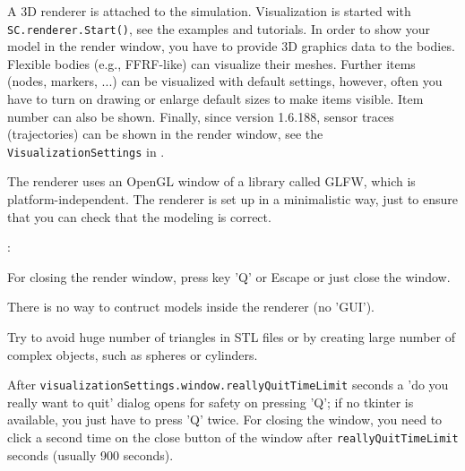 A 3D renderer is attached to the simulation. Visualization is started with  \texttt{SC.renderer.Start()}, see the examples and tutorials.
In order to show your model in the render window, you have to provide 3D graphics data to the bodies. Flexible bodies (e.g., FFRF-like) can visualize their meshes. Further items (nodes, markers, ...) can be visualized with default settings, however, often you have to turn on drawing or enlarge default sizes to make items visible. Item number can also be shown.
Finally, since version 1.6.188, sensor traces (trajectories) can be shown in the render window, see the \texttt{VisualizationSettings} in  .

The renderer uses an OpenGL window of a library called GLFW, which is platform-independent. 
The renderer is set up in a minimalistic way, just to ensure that you can check that the modeling is correct. 

\noindent {}:
\bi
  \item For closing the render window, press key 'Q' or Escape or just close the window.
  \item There is no way to contruct models inside the renderer (no 'GUI').
  \item Try to avoid huge number of triangles in STL files or by creating large number of complex objects, such as spheres or cylinders.
  \item After \texttt{visualizationSettings.window.reallyQuitTimeLimit} seconds a 'do you really want to quit' dialog opens for safety on pressing 'Q'; if no tkinter is available, you just have to press 'Q' twice. For closing the window, you need to click a second time on the close button of the window after \texttt{reallyQuitTimeLimit} seconds (usually 900 seconds).
\ei
 
